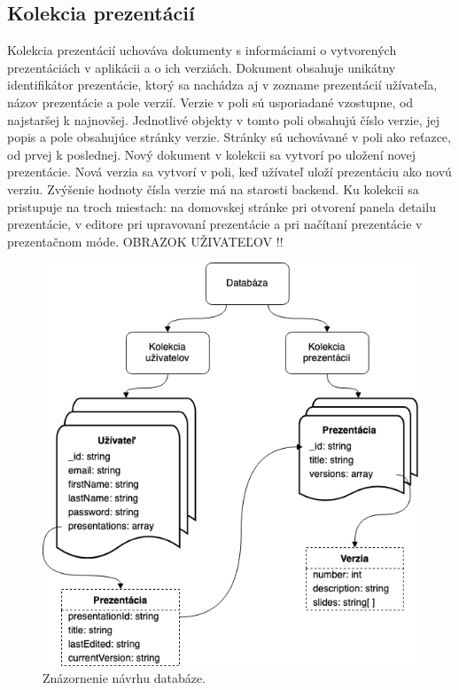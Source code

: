 \subsection*{Kolekcia prezentácií}
Kolekcia prezentácií uchováva dokumenty s informáciami o vytvorených prezentáciách v aplikácii a o ich verziách. Dokument obsahuje unikátny identifikátor prezentácie, ktorý sa nachádza aj v zozname prezentácií užívateľa, názov prezentácie a pole verzií. Verzie v poli sú usporiadané vzostupne, od najstaršej k najnovšej. Jednotlivé objekty v tomto poli obsahujú číslo verzie, jej popis a pole obsahujúce stránky verzie. Stránky sú uchovávané v poli ako reťazce, od prvej k poslednej. Nový dokument v kolekcii sa vytvorí po uložení novej prezentácie. Nová verzia sa vytvorí v poli, keď užívateľ uloží prezentáciu ako novú verziu. Zvýšenie hodnoty čísla verzie má na starosti backend. Ku kolekcii sa pristupuje na troch miestach: na domovskej stránke pri otvorení panela detailu prezentácie, v editore pri upravovaní prezentácie a pri načítaní prezentácie v prezentačnom móde. OBRAZOK UŽIVATEĽOV !!

    \begin{figure}[!hbt]
        \centering
        \includegraphics[scale=0.5]{obrazky/databaza.png}
        \caption{Znázornenie návrhu databáze.}
        \label{pic:database}
    \end{figure}
    
